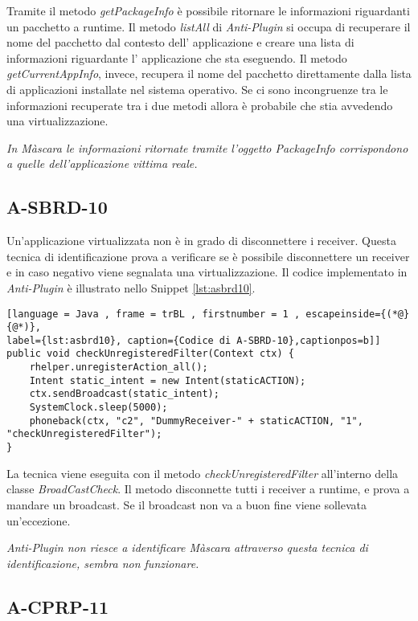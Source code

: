 Tramite il metodo \emph{getPackageInfo} è possibile ritornare le informazioni riguardanti un pacchetto a runtime. Il metodo \emph{listAll} di \emph{Anti-Plugin} si occupa di recuperare il nome del pacchetto dal contesto dell' applicazione e creare una lista di informazioni riguardante l' applicazione che sta eseguendo. Il metodo \emph{getCurrentAppInfo}, invece, recupera il nome del pacchetto direttamente dalla lista di applicazioni installate nel sistema operativo. Se ci sono incongruenze tra le informazioni recuperate tra i due metodi allora è probabile che stia avvedendo una virtualizzazione. 

\emph{In Màscara le informazioni ritornate tramite l'oggetto PackageInfo corrispondono a quelle dell'applicazione vittima reale.}


\subsection*{A-SBRD-10}
\label{a-sbrd-10}

Un'applicazione virtualizzata non è in grado di disconnettere i receiver. Questa tecnica di identificazione prova a verificare se è possibile disconnettere un receiver e in caso negativo viene segnalata una virtualizzazione.
Il codice implementato in \emph{Anti-Plugin} è illustrato nello Snippet \ref{lst:asbrd10}.

\begin{lstlisting}[language = Java , frame = trBL , firstnumber = 1 , escapeinside={(*@}{@*)},
label={lst:asbrd10}, caption={Codice di A-SBRD-10},captionpos=b]]
public void checkUnregisteredFilter(Context ctx) {
    rhelper.unregisterAction_all();
    Intent static_intent = new Intent(staticACTION);
    ctx.sendBroadcast(static_intent);
    SystemClock.sleep(5000);
    phoneback(ctx, "c2", "DummyReceiver-" + staticACTION, "1", "checkUnregisteredFilter");
}
\end{lstlisting}

La tecnica viene eseguita con il metodo \emph{checkUnregisteredFilter} all’interno della classe \emph{BroadCastCheck}. 
Il metodo disconnette tutti i receiver a runtime, e prova a mandare un broadcast. Se il broadcast non va a buon fine viene sollevata un'eccezione.

\emph{Anti-Plugin non riesce a identificare Màscara attraverso questa tecnica di identificazione, sembra non funzionare.}

\newpage
\subsection*{A-CPRP-11}
\label{a-cprp-11}


